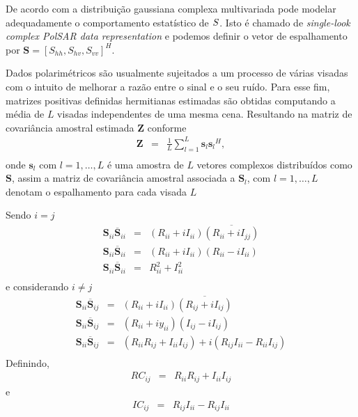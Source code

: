 \documentclass[conference]{IEEEtran}
\begin{document}
De acordo com \cite{good} a distribuição gaussiana complexa multivariada pode modelar adequadamente o comportamento estatístico de $\boldmath S$. Isto é chamado de {\it single-look complex PolSAR data representation} e podemos definir o vetor de espalhamento por $\mathbf{S}=[S_{hh},S_{hv},S_{vv}]^H$. 

Dados polarimétricos são usualmente sujeitados a um processo de várias visadas com o intuito de melhorar a razão entre o sinal e o seu ruído. Para esse fim, matrizes positivas definidas hermitianas estimadas são obtidas computando a média de $L$ visadas independentes de uma mesma cena. Resultando na matriz de covariância amostral estimada {\bf Z} conforme \cite{good, ade}
\begin{equation}
\begin{array}{ccc}
    \mathbf{Z}&=&\frac{1}{L}\displaystyle{\sum_{l=1}^{L} {\mathbf{s}_l}{\mathbf{s}_l}^H}, \\
\end{array}
\end{equation}
onde $\mathbf{s}_l$ com $l = 1, \dots, L$ é uma amostra de $\mathit{L}$ vetores complexos distribuídos como $\mathbf{S}$, assim a matriz de covariância amostral associada a $\mathbf{S}_l$, com $l=1,\dots,L$ denotam o espalhamento para cada visada $L$

Sendo $i=j$
\begin{equation}
\begin{array}{ccc}
\mathbf{S}_{ii}\overline{\mathbf{S}}_{ii}&=& (R_{ii}+iI_{ii})\overline{(R_{ii}+iI_{jj})} \\
\mathbf{S}_{ii}\overline{\mathbf{S}}_{ii}&=& (R_{ii}+iI_{ii})(R_{ii}-iI_{ii}) \\
\mathbf{S}_{ii}\overline{\mathbf{S}}_{ii}&=& R_{ii}^2+I_{ii}^2 \\
\end{array}
\end{equation}
e considerando $i \neq j$
\begin{equation}
\begin{array}{ccc}
\mathbf{S}_{ii}\overline{\mathbf{S}}_{ij}&=& (R_{ii}+iI_{ii})\overline{(R_{ij}+iI_{ij})} \\
\mathbf{S}_{ii}\overline{\mathbf{S}}_{ij}&=& (R_{ii}+iy_{ii})(I_{ij}-iI_{ij}) \\
\mathbf{S}_{ii}\overline{\mathbf{S}}_{ij}&=& (R_{ii}R_{ij}+I_{ii}I_{ij})+i(R_{ij}I_{ii}-R_{ii}I_{ij}) \\
\end{array}
\end{equation}
 Definindo,
 \begin{equation}
\begin{array}{ccc}
	  RC_{ij}&=&  R_{ii}R_{ij}+I_{ii}I_{ij} 
\end{array}
\end{equation}
e
\begin{equation}
\begin{array}{ccc}
	  IC_{ij}&=& R_{ij}I_{ii}-R_{ij}I_{ii}
\end{array}
\end{equation}
\end{document}
